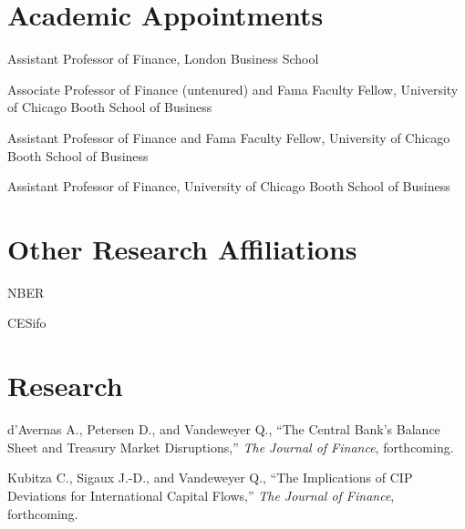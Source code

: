 \documentclass[11pt]{res} %
\begin{document}
\begin{resume}

\vspace{35pt}

\section{Academic Appointments} 
\vspace{8pt}

 Assistant Professor of Finance, London Business School

 Associate Professor of Finance (untenured) and Fama Faculty Fellow, University of Chicago Booth School of Business

 Assistant Professor of Finance and Fama Faculty Fellow, University of Chicago Booth School of Business

 Assistant Professor of Finance, University of Chicago Booth School of Business


\section{Other Research Affiliations} 
\vspace{8pt}

 NBER

 CESifo

\section{Research}
\vspace{8pt}

d'Avernas A., Petersen D., and Vandeweyer Q., ``The Central Bank's Balance Sheet and Treasury Market Disruptions,'' \textit{The Journal of Finance}, forthcoming.

\vspace{6pt}

Kubitza C., Sigaux J.-D., and Vandeweyer Q., ``The Implications of CIP Deviations for International Capital Flows,'' \textit{The Journal of Finance}, forthcoming.

\vspace{6pt}


\end{resume}
\end{document}
